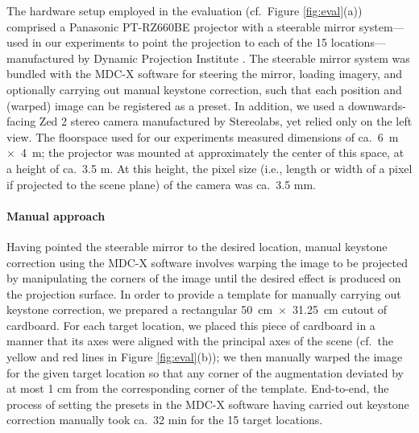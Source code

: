 \documentclass[review]{elsarticle}
\begin{document}
The hardware setup employed in the evaluation (cf.\ Figure \ref{fig:eval}(a)) comprised a Panasonic PT-RZ660BE projector with a steerable mirror system---used in our experiments to point the projection to each of the 15 locations---manufactured by Dynamic Projection Institute \cite{rupprecht2020information,Rupprecht2021}. The steerable mirror system was bundled with the MDC-X software for steering the mirror, loading imagery, and optionally carrying out manual keystone correction, such that each position and (warped) image can be registered as a preset. In addition, we used a downwards-facing Zed 2 stereo camera manufactured by Stereolabs, yet relied only on the left view. The floorspace used for our experiments measured dimensions of ca.\ 6~m~$\times$~4~m; the projector was mounted at approximately the center of this space, at a height of ca.\ 3.5 m. At this height, the pixel size (i.e., length or width of a pixel if projected to the scene plane) of the camera was ca.\ 3.5 mm.

\paragraph{Manual approach} Having pointed the steerable mirror to the desired location, manual keystone correction using the MDC-X software involves warping the image to be projected by manipulating the corners of the image until the desired effect is produced on the projection surface. In order to provide a template for manually carrying out keystone correction, we prepared a rectangular 50~cm~$\times$~31.25~cm cutout of cardboard. For each target location, we placed this piece of cardboard in a manner that its axes were aligned with the principal axes of the scene (cf.\ the yellow and red lines in Figure \ref{fig:eval}(b)); we then manually warped the image for the given target location so that any corner of the augmentation deviated by at most 1 cm from the corresponding corner of the template. End-to-end, the process of setting the presets in the MDC-X software having carried out keystone correction manually took ca.\ 32 min for the 15 target locations.
\end{document}
